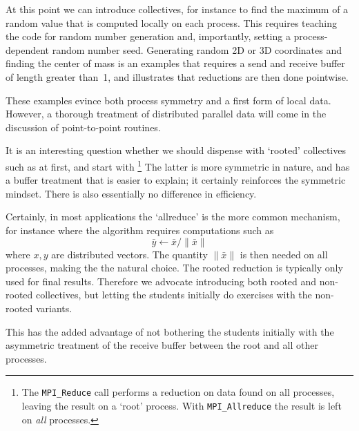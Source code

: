 At this point we can introduce collectives, for instance to find the maximum
of a random value that is computed locally on each process. This requires teaching
the code for random number generation and, importantly, setting a process-dependent
random number seed.
Generating random 2D or 3D coordinates and finding the center of mass
is an examples that requires a send and receive buffer of length greater than~1,
and illustrates that reductions are then done pointwise.

These examples evince both process symmetry and a first form
of local data. However, a thorough treatment of distributed parallel data
will come in the discussion of point-to-point routines.

It is an interesting question whether we should dispense with `rooted'
collectives such as  at first, and start with
\footnote{The {\tt MPI\_Reduce} call performs a
  reduction on data found on all processes, leaving the result on a
  `root' process. With {\tt MPI\_Allreduce} the result is left on
  \emph{all} processes.}
The latter is more symmetric in nature, and has a
buffer treatment that is easier to explain; it certainly reinforces
the symmetric mindset.
There is also essentially no difference in efficiency.
\begin{comment}
  To this author, there are few reasons to prefer
  {\small
\begin{verbatim}
MPI_Reduce( indata,outdata, /* root= */ 0 );
if (myprocno==0)
  printf("The result is .... ",outdata);
\end{verbatim}
  }
  over
  {\small
\begin{verbatim}
MPI_Allreduce( indata,outdata );
if (myprocno==0)
  printf("The result is .... ",outdata);
\end{verbatim}
  }
\end{comment}

Certainly, in most applications the `allreduce' is the more common
mechanism, for instance where the algorithm requires computations such
as 
\[ \bar y \leftarrow \bar x/\| \bar x\| \]
where $x,y$ are distributed vectors. The quantity $\|\bar x\|$ is then
needed on all processes, making the  the natural choice.
The rooted reduction is typically only used for
final results. Therefore we advocate introducing both rooted and
non-rooted collectives, but letting the students initially do
exercises with the non-rooted variants.

This has the added advantage of not bothering the students initially
with the asymmetric treatment of the receive buffer between the root
and all other processes.

